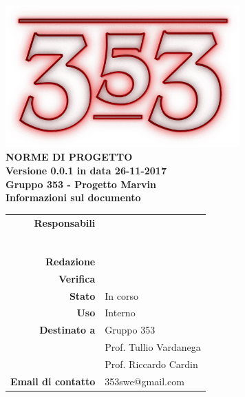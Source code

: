 \documentclass[openany, a4paper, 12pt]{report}
\begin{document}
\begin{titlepage}
	\centering
	\vfill
	{
		\bfseries
		\vskip2cm
		\includegraphics[width=9cm]{../../common/images/logo.png} \\
		\vfill
		\Huge{NORME DI PROGETTO}\\
		\vfill
		\Large Versione 0.0.1 in data 26-11-2017\\
		\large Gruppo 353 - Progetto Marvin\\
		\vfill
		\normalsize Informazioni sul documento\\
		\begin{table}[htbp]
			\centering
			\renewcommand\arraystretch{1.2}
			\begin{tabular}{r|l}
				\hline
				\textbf{Responsabili}	& \Elena\\
										& \Valentina\\
										& \Mirco\\
										& \Riccardo\\
										& \Gianluca\\
										& \Parwinder\\
										& \Davide\\
				
				\textbf{Redazione} 		& \\
				\textbf{Verifica} 		& \\	
				
				\textbf{Stato} 			& In corso\\
				\textbf{Uso}			& Interno\\
				\textbf{Destinato a}   	& Gruppo 353\\
										& Prof. Tullio Vardanega\\
										& Prof. Riccardo Cardin\\
				
				\textbf{Email di contatto}	& 353swe@gmail.com
			\end{tabular}
		\end{table}
		\vfill
	}    
\end{titlepage}

\tableofcontents
\newpage
{}




 
\end{document}
